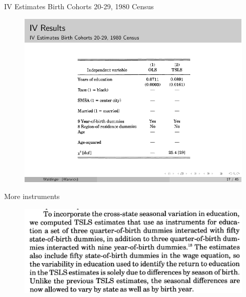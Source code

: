 \documentclass{beamer}
\begin{document}
\begin{frame}{IV Estimates Birth Cohorts 20-29, 1980 Census}
	
	\begin{figure}
	\includegraphics{./lecture_includes/qob_7.pdf}
	\end{figure}
	
\end{frame}




\begin{frame}{More instruments}

	\begin{figure}
	\includegraphics[scale=.25]{./lecture_includes/weak_qob1.png}
	\end{figure}
	

\end{frame}
\end{document}
